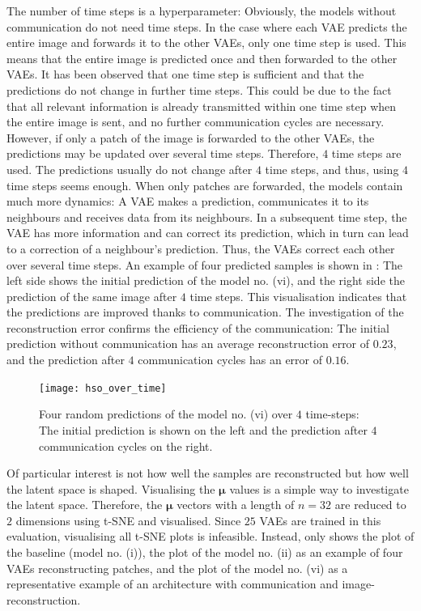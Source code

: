 The number of time steps is a hyperparameter: Obviously, the models without communication do not need time steps. In the case where each VAE predicts the entire image and forwards it to the other VAEs, only one time step is used. This means that the entire image is predicted once and then forwarded to the other VAEs. It has been observed that one time step is sufficient and that the predictions do not change in further time steps. This could be due to the fact that all relevant information is already transmitted within one time step when the entire image is sent, and no further communication cycles are necessary. However, if only a patch of the image is forwarded to the other VAEs, the predictions may be updated over several time steps. Therefore, $4$ time steps are used. The predictions usually do not change after $4$ time steps, and thus, using $4$ time steps seems enough. When only patches are forwarded, the models contain much more dynamics: A VAE makes a prediction, communicates it to its neighbours and receives data from its neighbours. In a subsequent time step, the VAE has more information and can correct its prediction, which in turn can lead to a correction of a neighbour's prediction. Thus, the VAEs correct each other over several time steps. An example of four predicted samples is shown in : The left side shows the initial prediction of the model no. (vi), and the right side the prediction of the same image after $4$ time steps. This visualisation indicates that the predictions are improved thanks to communication. The investigation of the reconstruction error confirms the efficiency of the communication: The initial prediction without communication has an average reconstruction error of $0.23$, and the prediction after $4$ communication cycles has an error of $0.16$.

\begin{figure}[h]
    \centering
    \texttt{[image: hso\_over\_time]}
    \caption[Change of the model's prediction over time]{Four random predictions of the model no. (vi) over $4$ time-steps: The initial prediction is shown on the left and the prediction after $4$ communication cycles on the right.}
\end{figure}

Of particular interest is not how well the samples are reconstructed but how well the latent space is shaped. Visualising the $\boldsymbol{\mu}$ values is a simple way to investigate the latent space. Therefore, the $\boldsymbol{\mu}$ vectors with a length of $n=32$ are reduced to $2$ dimensions using t-SNE  and visualised. Since $25$ VAEs are trained in this evaluation, visualising all t-SNE plots is infeasible. Instead,  only shows the plot of the baseline (model no. (i)), the plot of the model no. (ii) as an example of four VAEs reconstructing patches, and the plot of the model no. (vi) as a representative example of an architecture with communication and image-reconstruction.

